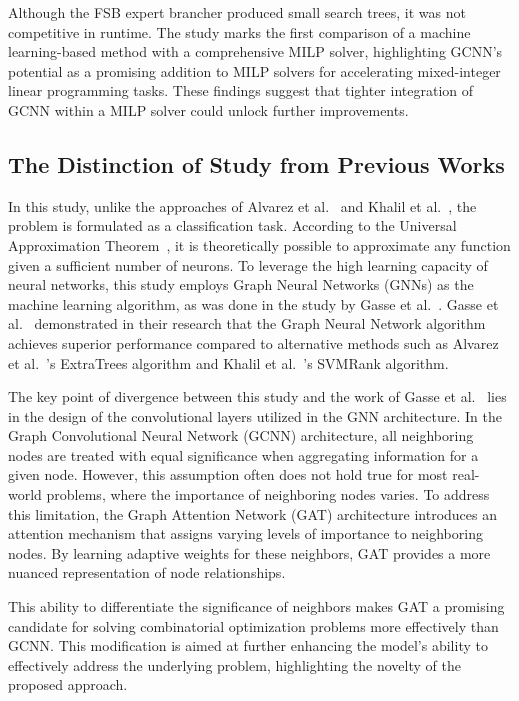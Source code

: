 Although the FSB expert brancher produced small search trees, it was not competitive in runtime.
The study marks the first comparison of a machine learning-based method with a comprehensive MILP solver, highlighting GCNN's potential as a promising addition to MILP solvers for accelerating mixed-integer linear programming tasks.
These findings suggest that tighter integration of GCNN within a MILP solver could unlock further improvements.



\subsection{The Distinction of Study from Previous Works}
In this study, unlike the approaches of Alvarez et al.~\cite{alvarezMachineLearningBasedApproximation2017} and Khalil et al.~\cite{khalilLearningBranchMixed2016}, the problem is formulated as a classification task.
According to the Universal Approximation Theorem~\cite{luUniversalApproximationTheorem2020}, it is theoretically possible to approximate any function given a sufficient number of neurons.
To leverage the high learning capacity of neural networks, this study employs Graph Neural Networks (GNNs) as the machine learning algorithm, as was done in the study by Gasse et al.~\cite{gasseExactCombinatorialOptimization2019}.
Gasse et al.~\cite{gasseExactCombinatorialOptimization2019} demonstrated in their research that the Graph Neural Network algorithm achieves superior performance compared to alternative methods such as Alvarez et al.~\cite{alvarezMachineLearningBasedApproximation2017}’s ExtraTrees algorithm and Khalil et al.~\cite{khalilLearningBranchMixed2016}’s SVMRank algorithm.


The key point of divergence between this study and the work of Gasse et al.~\cite{gasseExactCombinatorialOptimization2019} lies in the design of the convolutional layers utilized in the GNN architecture.
In the Graph Convolutional Neural Network (GCNN) architecture, all neighboring nodes are treated with equal significance when aggregating information for a given node.
However, this assumption often does not hold true for most real-world problems, where the importance of neighboring nodes varies.
To address this limitation, the Graph Attention Network (GAT) architecture introduces an attention mechanism that assigns varying levels of importance to neighboring nodes.
By learning adaptive weights for these neighbors, GAT provides a more nuanced representation of node relationships.


This ability to differentiate the significance of neighbors makes GAT a promising candidate for solving combinatorial optimization problems more effectively than GCNN.
This modification is aimed at further enhancing the model's ability to effectively address the underlying problem, highlighting the novelty of the proposed approach.